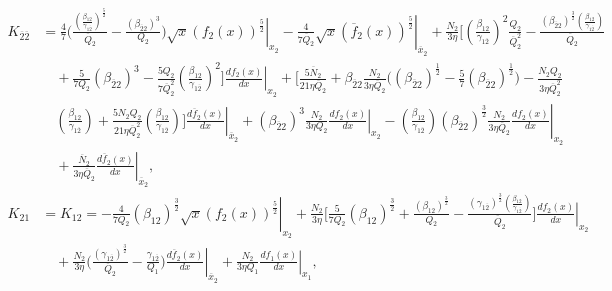 \documentclass[fleqn]{article}
\begin{document}
            \begin{equation}
                \begin{split}
                    K_{\overline{2}\overline{2}} &= \frac{4}{7} \biggl( \frac{\left(\frac{\beta_{12}}{\gamma_{1\overline{2}}}\right)^\frac{5}{2}}{\overline{Q}_{2}} - \frac{\left(\beta_{\overline{2}2
                    }\right)^{3}}{Q_{2}} \left. \biggr) \sqrt{x}  (f_{2}(x))^\frac{5}{2} \right|_{x_{2}} - \left. \frac{4}{7 \overline{Q}_{2}} \sqrt{x} (\overline{f}_{2}(x))^\frac{5}{2} \right|_{\overline{x}_{2}}+ \frac{N_{2}}{3 \eta} \biggl[ \left(\frac{\beta_{12}}{\gamma_{1\overline{2}}}\right)^{2} \frac{Q_{2}}{\overline{Q}_{2}^{2}} - \frac{(\beta_{\overline{2}2})^\frac{3}{2} \left(\frac{\beta_{12}}{\gamma_{1\overline{2}}}\right)}{\overline{Q}_{2}} \\ & \quad + \frac{5}{7 Q_{2}} (\beta_{\overline{2}2})^{3}  - \frac{5 Q_{2}}{7 \overline{Q}_{2}^{2}} \left(\frac{\beta_{12}}{\gamma_{1\overline{2}}}\right)^{2} \left. \biggr] \frac{df_{2}(x)}{dx} \right|_{x_{2}} + \biggl[ \frac{5 \overline{N}_{2}}{21 \eta \overline{Q}_{2}} + \beta_{\overline{2}2} \frac{N_{2}}{3 \eta \overline{Q}_{2}} \biggl( (\beta_{\overline{2}2})^\frac{1}{2} - \frac{5}{7} (\beta_{\overline{2}2})^\frac{1}{2} \biggr) - \frac{N_{2} Q_{2}}{3 \eta \overline{Q}_{2}^{2}} \\ & \quad \left(\frac{\beta_{12}}{\gamma_{1\overline{2}}}\right) + \frac{5 N_{2} Q_{2}}{21 \eta \overline{Q}_{2}^{2}} \left(\frac{\beta_{12}}{\gamma_{1\overline{2}}}\right) \left. \biggr] \frac{d\overline{f}_{2}(x)}{dx} \right|_{\overline{x}_{2}} + (\beta_{\overline{2}2})^3\frac{N_{2}}{3 \eta Q_{2} } \left. \frac{df_{2}(x)}{dx} \right|_{x_{2}}- \left. \left(\frac{\beta_{12}}{\gamma_{1\overline{2}}}\right) (\beta_{\overline{2}2})^\frac{3}{2}\frac{N_{2}}{3 \eta \overline{Q}_{2}} \frac{d f_{2}(x)}{dx} \right|_{x_{2}} \\ & \quad + \left. \frac{\overline{N}_{2}}{3\eta \overline{Q}_{2}} \frac{d\overline{f}_{2}(x)}{dx} \right|_{\overline{x}_{2}},
                \end{split}
            \label{eqn:k2bar2bar_caseII}
            \end{equation}
            \begin{equation}
                \begin{split}
                    K_{21} & = K_{12}= -  \left.\frac{4}{7Q_{2}} (\beta_{12})^\frac{3}{2} \sqrt{x} (f_{2}(x))^\frac{5}{2} \right|_{x_{2}} + \frac{N_{2}}{3 \eta} \Biggl[ \frac{5}{7 Q_{2}} (\beta_{12})^\frac{3}{2}+  \frac{(\beta_{12})^\frac{3}{2}}{Q_{2}} - \frac{(\gamma_{1\overline{2}})^\frac{3}{2} \left(\frac{\beta_{12}}{\gamma_{1\overline{2}}}\right)}{\overline{Q}_{2}} \Biggr] \left. \frac{df_{2}(x)}{dx}\right|_{x_{2}} \\ & \quad +   \frac{N_{2}}{3 \eta}  \Biggl(\frac{(\gamma_{1\overline{2}})^\frac{3}{2}}{\overline{Q}_{2}}  - \left. \frac{\gamma_{1\overline{2}}}{Q_1} \Biggr) \frac{d\overline{f}_{2}(x)}{dx} \right|_{\overline{x}_{2}}  + \left. \frac{N_{2}}{3 \eta Q_1} \frac{df_1(x)}{dx} \right|_{x_1},
                \end{split}
            \label{eqn:k21_caseII}
            \end{equation}
\end{document}
